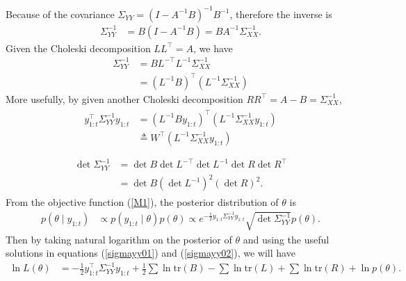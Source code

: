 Because of the covariance  $\Sigma_{YY} =  (I-A^{-1}B)^{-1}B^{-1}$, therefore the inverse is 
\begin{align*}
\Sigma_{YY}^{-1} &= B(I-A^{-1}B)= BA^{-1}\Sigma_{XX}^{-1}.
\end{align*}
Given the Choleski decomposition $LL^\top = A$, we have
\begin{align*}
\Sigma_{YY}^{-1} &=BL^{-\top}L^{-1}\Sigma_{XX}^{-1}\\
&=(L^{-1}B)^\top(L^{-1}\Sigma_{XX}^{-1}) %
\end{align*}
More usefully, by given another Choleski decomposition $RR^\top=A-B=\Sigma_{XX}^{-1}$,
\begin{align}\label{sigmayy01}
\begin{split}
y_{1:t}^\top \Sigma_{YY}^{-1} y_{1:t} &= (L^{-1}By_{1:t})^\top(L^{-1}\Sigma_{XX}^{-1}y_{1:t})\\
&\triangleq W^\top (L^{-1}\Sigma_{XX}^{-1}y_{1:t})\\
\end{split}
\end{align}
\begin{align}\label{sigmayy02}
\begin{split}
\det\Sigma_{YY}^{-1} &= \det B \det L^{-\top}\det L^{-1}\det R\det R^\top\\
&= \det B(\det L^{-1})^2(\det R)^2.
\end{split}
\end{align}
From the objective function (\ref{M1}), the posterior distribution of $\theta$ is 
\begin{align*}
p(\theta \mid y_{1:t}) &\propto p(y_{1:t}\mid\theta)p(\theta) \propto e^{-\frac{1}{2} y_{1:t} \Sigma_{YY}^{-1} y_{1:t} } \sqrt{\det \Sigma_{YY}^{-1}} p(\theta).
\end{align*}
Then by taking natural logarithm on the posterior of $\theta$ and using the useful solutions in equations (\ref{sigmayy01}) and (\ref{sigmayy02}), we will have
\begin{align}
\ln L(\theta) &= -\frac{1}{2}y_{1:t}^\top\Sigma_{YY}^{-1}y_{1:t}+\frac{1}{2}\sum\ln\mbox{tr}(B)-\sum\ln\mbox{tr}(L)+\sum\ln\mbox{tr}(R) + \ln p(\theta).
\end{align}



